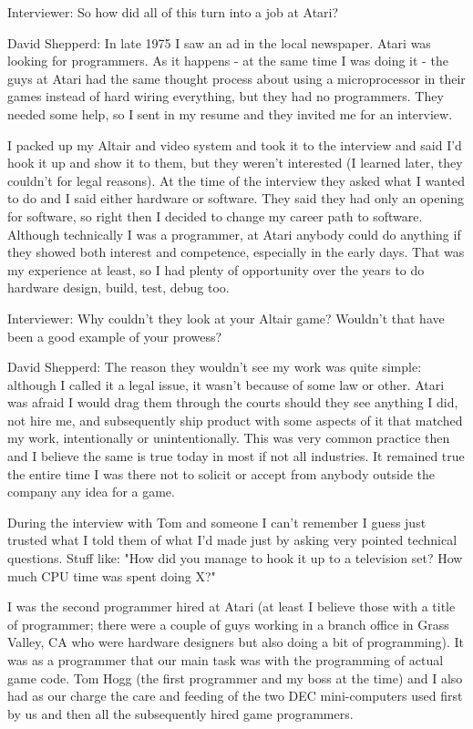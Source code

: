 \textcolor{interviewer}{Interviewer:} So how did all of this turn into a job at Atari?

\textcolor{interviewee}{David Shepperd:} In late 1975 I saw an ad in the local newspaper. Atari was looking for programmers. As it happens - at the same time I was doing it - the guys at Atari had the same thought process about using a microprocessor in their games instead of hard wiring everything, but they had no programmers. They needed some help, so I sent in my resume and they invited me for an interview. 

I packed up my Altair and video system and took it to the interview and said I'd hook it up and show it to them, but they weren't interested (I learned later, they couldn't for legal reasons). At the time of the interview they asked what I wanted to do and I said either hardware or software. They said they had only an opening for software, so right then I decided to change my career path to software. Although technically I was a programmer, at Atari anybody could do anything if they showed both interest and competence, especially in the early days. That was my experience at least, so I had plenty of opportunity over the years to do hardware design, build, test, debug too.

\textcolor{interviewer}{Interviewer:} Why couldn’t they look at your Altair game? Wouldn’t that have been a good example of your prowess?

\textcolor{interviewee}{David Shepperd:} The reason they wouldn't see my work was quite simple: although I called it a legal issue, it wasn't because of some law or other. Atari was afraid I would drag them through the courts should they see anything I did, not hire me, and subsequently ship product with some aspects of it that matched my work, intentionally or unintentionally. This was very common practice then and I believe the same is true today in most if not all industries. It remained true the entire time I was there not to solicit or accept from anybody outside the company any idea for a game. 

During the interview with Tom and someone I can’t remember I guess just trusted what I told them of what I'd made just by asking very pointed technical questions. Stuff like: "How did you manage to hook it up to a television set? How much CPU time was spent doing X?"

I was the second programmer hired at Atari (at least I believe those with a title of programmer; there were a couple of guys working in a branch office in Grass Valley, CA who were hardware designers but also doing a bit of programming). It was as a programmer that our main task was with the programming of actual game code. Tom Hogg (the first programmer and my boss at the time) and I also had as our charge the care and feeding of the two DEC mini-computers used first by us and then all the subsequently hired game programmers.

